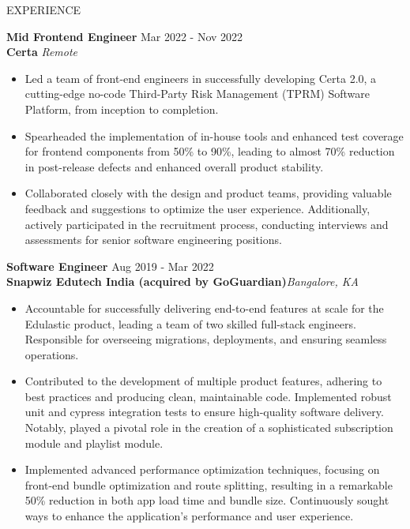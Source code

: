 \documentclass{resume} %
\begin{document}
\begin{rSection}{EXPERIENCE}

\textbf{\large Mid Frontend Engineer} \hfill Mar 2022 - Nov 2022\\
\textbf{\small Certa} \hfill \textit{Remote}
 \begin{itemize}
    \itemsep -4pt {} 
     \item Led a team of front-end engineers in successfully developing Certa 2.0, a cutting-edge no-code Third-Party Risk Management (TPRM) Software Platform, from inception to completion.
     \item Spearheaded the implementation of in-house tools and enhanced test coverage for frontend components from 50\% to 90\%, leading to almost 70\% reduction in post-release defects and enhanced overall product stability.
    \item  Collaborated closely with the design and product teams, providing valuable feedback and suggestions to optimize the user experience. Additionally, actively participated in the recruitment process, conducting interviews and assessments for senior software engineering positions.
 \end{itemize}

\textbf{\large Software Engineer} \hfill Aug 2019 - Mar 2022\\
\textbf{\small Snapwiz Edutech India (acquired by GoGuardian)}\hfill \textit{Bangalore, KA}
 \begin{itemize}
    \itemsep -4pt {} 
     \item Accountable for successfully delivering end-to-end features at scale for the Edulastic product, leading a team of two skilled full-stack engineers. Responsible for overseeing migrations, deployments, and ensuring seamless operations.
     \item Contributed to the development of multiple product features, adhering to best practices and producing clean, maintainable code. Implemented robust unit and cypress integration tests to ensure high-quality software delivery. Notably, played a pivotal role in the creation of a sophisticated subscription module and playlist module.
    \item Implemented advanced performance optimization techniques, focusing on front-end bundle optimization and route splitting, resulting in a remarkable 50\% reduction in both app load time and bundle size. Continuously sought ways to enhance the application's performance and user experience.  
 \end{itemize}

\end{rSection} 
\end{document}
